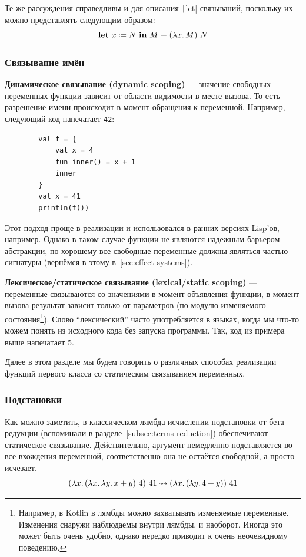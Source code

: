 \documentclass[12pt]{article}
\newcommand{\vocab}[1]{\textbf{#1}} %
\newcommand{\term}[1]{\mathbf{#1}}
\newcommand{\ap}{~}
\newcommand{\termdef}{\coloneqq}
\begin{document}
    Те же рассуждения справедливы и для описания \texttt|let|-связываний, поскольку их можно представлять следующим образом:
    \[
        \term{let} \ap x \termdef N \ap \term{in} \ap M \equiv (\lambda x\ldotp M) \ap N
    \]

    \subsubsection{Связывание имён}

    \vocab{Динамическое связывание (dynamic scoping)} --- значение свободных переменных функции зависит от области видимости в месте вызова.
    То есть разрешение имени происходит в момент обращения к переменной.
    Например, следующий код напечатает \texttt{42}:
    \begin{verbatim}
        val f = {
            val x = 4
            fun inner() = x + 1
            inner
        }
        val x = 41
        println(f())
    \end{verbatim}

    Этот подход проще в реализации и использовался в ранних версиях Lisp'ов, например.
    Однако в таком случае функции не являются надежным барьером абстракции, по-хорошему все свободные переменные должны являться частью сигнатуры (вернёмся в этому в~\ref{sec:effect-systems}).

    \vocab{Лексическое/статическое связывание (lexical/static scoping)} --- переменные связываются со значениями в момент объявления функции, в момент вызова результат зависит только от параметров (по модулю изменяемого состояния\footnote{Например, в Kotlin в лямбды можно захватывать изменяемые переменные. Изменения снаружи наблюдаемы внутри лямбды, и наоборот. Иногда это может быть очень удобно, однако нередко приводит к очень неочевидному поведению.}).
    Слово ``лексический'' часто употребляется в языках, когда мы что-то можем понять из исходного кода без запуска программы.
    Так, код из примера выше напечатает 5.

    Далее в этом разделе мы будем говорить о различных способах реализации функций первого класса со статическим связыванием переменных.

    \subsubsection{Подстановки}

    Как можно заметить, в классическом лямбда-исчислении подстановки от бета-редукции (вспоминали в разделе~\ref{subsec:terms-reduction}) обеспечивают статическое связывание.
    Действительно, аргумент немедленно подставляется во все вхождения переменной, соответственно она не остаётся свободной, а просто исчезает.
    \[
        (\lambda x\ldotp (\lambda x\ldotp \lambda y\ldotp x + y) \ap 4) \ap 41 \rightsquigarrow (\lambda x\ldotp (\lambda y\ldotp 4 + y)) \ap 41
    \]
\end{document}
